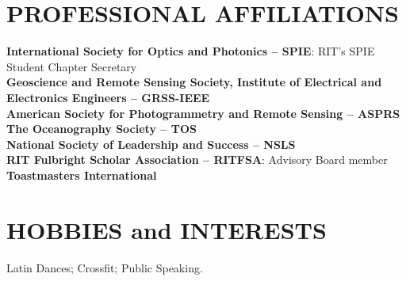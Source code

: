 \documentclass[11pt]{res} %
\begin{document}
\begin{resume}
\section{PROFESSIONAL AFFILIATIONS}
\vspace{0.1in}
{\bf International Society for Optics and Photonics -- SPIE}: RIT's SPIE Student Chapter Secretary 
\vspace{0.1in}\\
{\bf Geoscience and Remote Sensing Society, Institute of Electrical and Electronics Engineers -- GRSS-IEEE}
\vspace{0.1in}\\
{\bf American Society for Photogrammetry and Remote Sensing -- ASPRS}
\vspace{0.1in}\\
{\bf The Oceanography Society -- TOS}
\vspace{0.1in}\\
{\bf National Society of Leadership and Success -- NSLS}
\vspace{0.1in}\\
{\bf RIT Fulbright Scholar Association -- RITFSA}: Advisory Board member
\vspace{0.1in}\\
{\bf Toastmasters International}


\vspace{-0.1in}
\section{HOBBIES and INTERESTS}
\vspace{0.1in}
Latin Dances; Crossfit; Public Speaking.

\end{resume}
\end{document}
